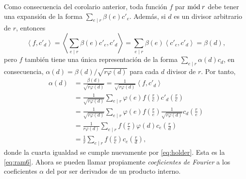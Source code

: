 Como consecuencia del corolario anterior, toda función $f$ par $\mathrm{m\acute{o}d\:}r$ debe tener una expansión de la forma $\sum_{e \mid r} \beta(e) c'_e$. Además, si $d$ es un divisor arbitrario de $r$, entonces
\begin{equation*}
    \left\langle f, c'_d \right\rangle = \left\langle \sum_{e \mid r} \beta(e) c'_e,c'_d \right\rangle = \sum_{e \mid r} \beta(e) \left\langle c'_e,c'_d \right\rangle = \beta(d),
\end{equation*}
pero $f$ también tiene una única representación de la forma $\sum_{e \mid r} \alpha(d) c_d$, en consecuencia, $\alpha(d) = \beta(d)/\sqrt{r \varphi(d)}$ para cada $d$ divisor de $r$. Por tanto,
\begin{align*}
    \alpha(d) & = \frac{\beta(d)}{\sqrt{r \varphi(d)}} = \frac{1}{\sqrt{r \varphi(d)}} \left\langle f, c'_d \right\rangle \\
                                                     & = \frac{1}{\sqrt{r \varphi(d)}} \sum_{e \mid r} \varphi(e) f \left( \frac{r}{e} \right) c'_d \left( \frac{r}{e} \right) \\
                                                     & = \frac{1}{\sqrt{r \varphi(d)}} \sum_{e \mid r} \varphi(e) f \left( \frac{r}{e} \right) \frac{1}{\sqrt{r \varphi(d)}} c_d \left( \frac{r}{e} \right) \\
                                                     & = \frac{1}{r \varphi(d)} \sum_{e \mid r} f \left( \frac{r}{e} \right) \varphi(d) c_e \left( \frac{r}{d} \right) \\
                                                     & = \frac{1}{r} \sum_{e \mid r} f \left( \frac{r}{e} \right) c_e \left( \frac{r}{d} \right),
\end{align*}
donde la cuarta igualdad se cumple nuevamente por \eqref{eq:holder}. Esta es la \cref{eq:ram6}. Ahora se pueden llamar propiamente \emph{coeficientes de Fourier} a los coeficientes $\alpha$ del  por ser derivados de un producto interno.
